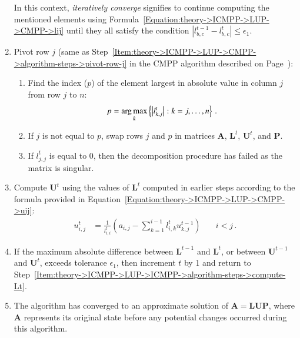 \begin{enumerate}
		In this context, \textit{iteratively converge} signifies to continue computing the mentioned elements using Formula~\ref{Equation:theory->ICMPP->LUP->CMPP->lij} until they all satisfy the condition $\left|l^{t-1}_{b, c} - l^{t}_{b, c}\right| \leq \epsilon_1$.
	\item \label{Item:theory->ICMPP->LUP->ICMPP->algorithm-steps->pivot-row}
		Pivot row $j$ (same as Step~\ref{Item:theory->ICMPP->LUP->CMPP->algorithm-steps->pivot-row-j} in the CMPP algorithm described on Page~\pageref{Item:theory->ICMPP->LUP->CMPP->algorithm-steps->pivot-row-j}):
		\begin{enumerate}
			\item \label{Item:theory->ICMPP->LUP->ICMPP->algorithm-steps->pivot-row->argmax}
				Find the index ($p$) of the element largest in absolute value in column $j$ from row $j$ to $n$:
				\begin{equation}
					p = \operatorname*{arg\,max}_k \left\{ \left| l^{t}_{k, j} \right|: k=j,\dots, n \right\} \nonumber\,.
				\end{equation}
			\item \label{Item:theory->ICMPP->LUP->ICMPP->algorithm-steps->pivot-row->swap-rows}
				If $j$ is not equal to $p$, swap rows $j$ and $p$ in matrices $\mathbf{A}$, $\mathbf{L}^{t}$, $\mathbf{U}^{t}$, and $\mathbf{P}$.
			\item \label{Item:theory->ICMPP->LUP->ICMPP->algorithm-steps->pivot-row->singular-matrix-check}
				If $l^{t}_{j,j}$ is equal to 0, then the decomposition procedure has failed as the matrix is singular.
		\end{enumerate}
	\item \label{Item:theory->ICMPP->LUP->ICMPP->algorithm-steps->compute-Ut}
		Compute $\mathbf{U}^{t}$ using the values of $\mathbf{L}^{t}$ computed in earlier steps according to the formula provided in Equation~\ref{Equation:theory->ICMPP->LUP->CMPP->uij}:
		\begin{align}
			u_{i,j}^{t} &= \frac{1}{l_{i,i}^{t}} \left ( a_{i,j} - \sum_{k=1}^{i-1}l_{i,k}^{t}u_{k,j}^{t-1} \right ) &\quad i < j \nonumber\,.
		\end{align}
	\item \label{Item:theory->ICMPP->LUP->ICMPP->algorithm-steps->evaluate-convergence-rule}
		If the maximum absolute difference between $\mathbf{L}^{t-1}$ and $\mathbf{L}^{t}$, or between $\mathbf{U}^{t-1}$ and $\mathbf{U}^{t}$, exceeds tolerance $\epsilon_1$, then increment $t$ by 1 and return to Step~\ref{Item:theory->ICMPP->LUP->ICMPP->algorithm-steps->compute-Lt}.
	\item The algorithm has converged to an approximate solution of $\mathbf{A} = \mathbf{LUP}$, where $\mathbf{A}$  represents its original state before any potential changes occurred during this algorithm.
\end{enumerate}

